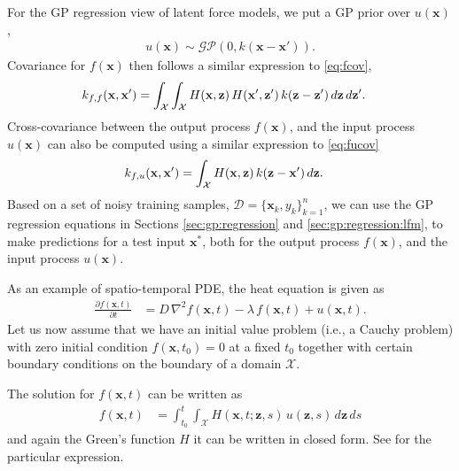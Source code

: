 \documentclass[journal]{IEEEtran}
\begin{document}
For the GP regression view of latent force models, we put a GP prior over $u(\mathbf{x})$,
\begin{align*}
u(\mathbf{x})\sim\mathcal{GP}(0, k(\mathbf{x} - \mathbf{x}')).
\end{align*}
Covariance for $f(\mathbf{x})$ then follows a similar expression to \eqref{eq:fcov},
\begin{equation}
\begin{split}
  k_{f,f}(\mathbf{x}, \mathbf{x}') &=
  \int_{\mathcal{X}}   \int_{\mathcal{X}}
  H(\mathbf{x}, \mathbf{z}) \, H(\mathbf{x}', \mathbf{z}') \, k(\mathbf{z} - \mathbf{z}') \, d\mathbf{z} \, d\mathbf{z}'.
\end{split}
\notag
\end{equation}
Cross-covariance between the output process $f(\mathbf{x})$, and the input process $u(\mathbf{x})$ can also be computed
using a similar expression to \eqref{eq:fucov}
\begin{align}
k_{f,u}(\mathbf{x},\mathbf{x}') & = \int_{\mathcal{X}} H(\mathbf{x}, \mathbf{z})\, k(\mathbf{z} - \mathbf{x}')\, d\mathbf{z}.
\notag
\end{align}
Based on a set of noisy training samples, $\mathcal{D}=\{\mathbf{x}_k, y_k\}_{k=1}^n$, we can
use the GP regression equations in Sections \ref{sec:gp:regression} and \ref{sec:gp:regression:lfm}, to make predictions
for a test input $\mathbf{x}^*$, both for the output process $f(\mathbf{x})$, and the input process $u(\mathbf{x})$.

As an example of spatio-temporal PDE, the heat equation is given as
\begin{align*}
  \frac{\partial f(\mathbf{x},t)}{\partial t} &= D \, \nabla^2 f(\mathbf{x},t) - \lambda \, f(\mathbf{x},t) + u(\mathbf{x},t).
\end{align*}
%
Let us now assume that we have an initial value problem (i.e., a Cauchy problem) with zero initial condition $f(\mathbf{x},t_0) = 0$ at a fixed $t_0$ together with certain boundary conditions on the boundary of a domain $\mathcal{X}$. 

The solution for $f(\mathbf{x},t)$ can be written as
\begin{align*}
f(\mathbf{x},t) & = \int_{t_0}^t \int_{\mathcal{X}} H(\mathbf{x}, t;  \mathbf{z}, s)\,
                u(\mathbf{z},s)\,d\mathbf{z}\,ds
\end{align*}
%
and again the Green's function $H$ it can be written in closed form. See \cite{Polyanin:Handbook02} for the particular expression. 
\end{document}
